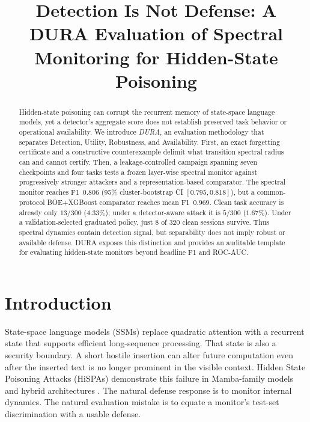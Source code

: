 \documentclass[sigconf]{acmart}
\title{Detection Is Not Defense: A DURA Evaluation of Spectral Monitoring for Hidden-State Poisoning}
\begin{document}
\begin{abstract}
Hidden-state poisoning can corrupt the recurrent memory of state-space
language models, yet a detector's aggregate score does not establish preserved
task behavior or operational availability. We introduce \emph{DURA}, an
evaluation methodology that separates Detection, Utility, Robustness, and
Availability. First, an exact forgetting certificate and a constructive
counterexample delimit what transition spectral radius can and cannot certify.
Then, a leakage-controlled campaign spanning seven checkpoints and four tasks
tests a frozen layer-wise spectral monitor against progressively stronger
attackers and a representation-based comparator. The spectral monitor reaches
F1~$0.806$ (95\% cluster-bootstrap CI $[0.795,0.818]$), but a common-protocol
BOE+XGBoost comparator reaches mean F1~$0.969$. Clean task accuracy is already
only $13/300$ ($4.33\%$); under a detector-aware attack it is $5/300$
($1.67\%$). Under a validation-selected graduated
policy, just 8 of 320 clean sessions survive. Thus spectral dynamics contain
detection signal, but separability does not imply robust or available defense.
DURA exposes this distinction and provides an auditable template for evaluating
hidden-state monitors beyond headline F1 and ROC-AUC.
\end{abstract}
\maketitle


\section{Introduction}
State-space language models (SSMs) replace quadratic attention with a recurrent
state that supports efficient long-sequence processing. That state is also a
security boundary. A short hostile insertion can alter future computation even
after the inserted text is no longer prominent in the visible context. Hidden
State Poisoning Attacks (HiSPAs) demonstrate this failure in Mamba-family
models and hybrid architectures \cite{lemercier2026hispa}. The natural defense
response is to monitor internal dynamics. The natural evaluation mistake is to
equate a monitor's test-set discrimination with a usable defense.
\end{document}
